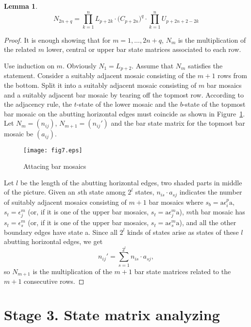 \documentclass[11pt,a4paper]{amsart}
\newtheorem{lemma}[theorem]{Lemma}
\begin{document}
\begin{lemma}\label{lem:state}
$$N_{2n+q} = \prod_{k=1}^n L_{p+2k} \cdot \big(C_{p+2n}\big)^q \cdot
\prod_{k=1}^n U_{p+2n+2-2k}$$
\end{lemma}

\begin{proof}
It is enough showing that for $m=1, \dots, 2n \! + \! q$,
$N_m$ is the multiplication of the related $m$ lower, central or upper bar state matrices 
associated to each row.

Use induction on $m$.
Obviously  $N_1 = L_{p+2}$.
Assume that $N_m$ satisfies the statement.
Consider a suitably adjacent mosaic consisting of the $m \! + \! 1$ rows from the bottom.
Split it into a suitably adjacent mosaic consisting of $m$ bar mosaics and a suitably adjacent bar mosaic by tearing off the topmost row.
According to the adjacency rule,
the $t$-state of the lower mosaic and the $b$-state of the topmost bar mosaic
on the abutting horizontal edges must coincide as shown in Figure~\ref{fig:split}.
Let $N_m = (n_{ij})$, $N_{m+1} = (n_{ij}')$ and
the bar state matrix for the topmost bar mosaic be $(a_{ij})$.

\begin{figure}[h]
\texttt{[image: fig7.eps]}
\caption{Attacing bar mosaics}
\label{fig:split}
\end{figure}

Let $l$ be the length of the abutting horizontal edges, two shaded parts in middle of the picture.
Given an $s$th state among $2^l$ states,
$n_{is}  \cdot  a_{sj}$ indicates the number of suitably adjacent mosaics consisting of $m \! + \! 1$ bar mosaics
where $s_b = \text{a} \epsilon^p_i \text{a}$,
$s_t = \epsilon^m_j$ (or, if it is one of the upper bar mosaics, $s_t = \text{a} \epsilon^m_j \text{a}$),
$m$th bar mosaic has $s_t = \epsilon^m_s$
(or, if it is one of the upper bar mosaics, $s_t = \text{a} \epsilon^m_s \text{a}$),
and all the other boundary edges have state a.
Since all $2^l$ kinds of states arise as states of these $l$ abutting horizontal edges,
we get
$$ n_{ij}' = \sum^{2^l}_{s=1} n_{is}  \cdot a_{sj},$$
so
$N_{m+1}$ is the multiplication of the $m \! + \! 1$ bar state matrices
related to the $m \! + \! 1$ consecutive rows.
\end{proof}


\section{Stage 3. State matrix analyzing} \label{sec:stage3}
\end{document}
